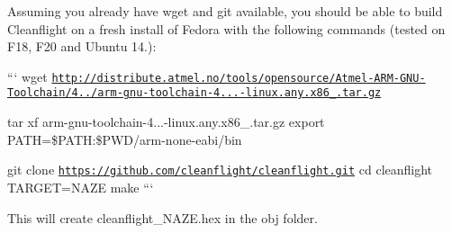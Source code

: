 Assuming you already have wget and git available, you should be able to build Cleanflight on a fresh install of Fedora with the following commands (tested on F18, F20 and Ubuntu 14.)\+:

``` wget \href{http://distribute.atmel.no/tools/opensource/Atmel-ARM-GNU-Toolchain/4.8.4/arm-gnu-toolchain-4.8.4.371-linux.any.x86_64.tar.gz}{\tt http\+://distribute.\+atmel.\+no/tools/opensource/\+Atmel-\/\+A\+R\+M-\/\+G\+N\+U-\/\+Toolchain/4../arm-\/gnu-\/toolchain-\/4...-\/linux.\+any.\+x86\+\_.\+tar.\+gz}

tar xf arm-\/gnu-\/toolchain-\/4...-\/linux.\+any.\+x86\+\_.\+tar.\+gz export P\+A\+T\+H=\$\+P\+A\+T\+H\+:\$\+P\+W\+D/arm-\/none-\/eabi/bin

git clone \href{https://github.com/cleanflight/cleanflight.git}{\tt https\+://github.\+com/cleanflight/cleanflight.\+git} cd cleanflight T\+A\+R\+G\+E\+T=N\+A\+Z\+E make ```

This will create cleanflight\+\_\+\+N\+A\+Z\+E.\+hex in the obj folder. 